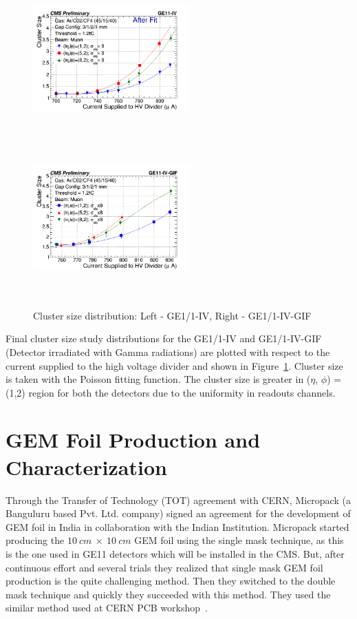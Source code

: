 \begin{figure}[!htbp]
   \begin{center}
     \includegraphics[width=6cm,height=6cm]{figures/GEM/CurrentvsClusterSizeAll3EtaPhi.png}
     \includegraphics[width=6cm,height=6cm]{figures/GEM/CurrentvsClusterSizeAll3EtaPhiGE11IVGIF.png}
   \end{center}
   \caption{Cluster size distribution: Left - GE1/1-IV, Right - GE1/1-IV-GIF}
   \label{fig:CSDGE1/1}
\end{figure}
Final cluster size study distributions for the GE1/1-IV and GE1/1-IV-GIF (Detector irradiated with Gamma radiations) are plotted with respect to the current supplied to the high voltage divider and shown in Figure~\ref{fig:CSDGE1/1}.
Cluster size is taken with the Poisson fitting function. The cluster size is greater in ($\eta$, $\phi$) = (1,2) region for both the detectors due to the uniformity in readouts channels.


\section{GEM Foil Production and Characterization} %
\label{sec:gem_foil_production_and_characterization}
Through the Transfer of Technology (TOT) agreement with CERN, Micropack (a Banguluru based Pvt. Ltd. company) signed an agreement for the development of GEM foil in India in collaboration with the Indian Institution.
Micropack started producing the $10~cm~\times~10~cm$ GEM foil using the single mask technique, as this is the one used in GE11 detectors which will be installed in the CMS.
But, after continuous effort and several trials they realized that single mask GEM foil production is the quite challenging method.
Then they switched to the double mask technique and quickly they succeeded with this method. 
They used the similar method used at CERN PCB workshop~\cite{DEOLIVEIRA2009}. 

